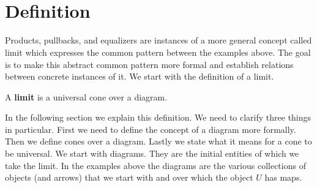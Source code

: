 \\[1em]
\begin{minipage}{.35\linewidth}
\end{minipage}%
\begin{minipage}{.35\linewidth}
\end{minipage}%
\begin{minipage}{.3\linewidth}
\end{minipage}\\[2em]

\section{Definition}
Products, pullbacks, and equalizers are instances of a more general concept called
limit which expresses the common pattern between the examples above.
The goal is to make this abstract common pattern more formal
and establish relations between concrete instances of it.
We start with the definition of a limit.
\begin{definition}
  A \textbf{limit} is a universal cone over a diagram.
\end{definition}

In the following section we explain this definition. We need to clarify three things
in particular.
First we need to define the concept of a diagram more formally.
Then we define cones over a diagram. Lastly we state what it means for a cone
to be universal.
We start with diagrams. They are the initial entities of which we take the limit.
In the examples above the diagrams
are the various collections of objects (and arrows) that we start with
and over which the object $U$ has maps.

